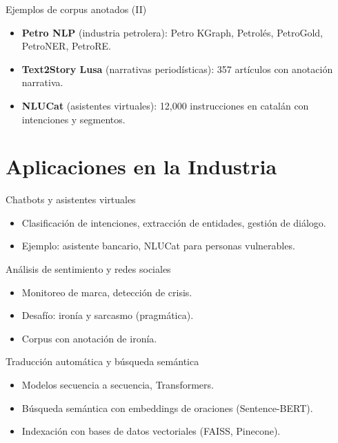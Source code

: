 \documentclass[aspectratio=169, 10pt, xcolor=table]{beamer}
\begin{document}
\begin{frame}{Ejemplos de corpus anotados (II)}
    \begin{itemize}
        \item \textbf{Petro NLP} (industria petrolera): Petro KGraph, Petrolés, PetroGold, PetroNER, PetroRE.
        \item \textbf{Text2Story Lusa} (narrativas periodísticas): 357 artículos con anotación narrativa.
        \item \textbf{NLUCat} (asistentes virtuales): 12,000 instrucciones en catalán con intenciones y segmentos.
    \end{itemize}
\end{frame}

\section{Aplicaciones en la Industria}

\begin{frame}{Chatbots y asistentes virtuales}
    \begin{itemize}
        \item Clasificación de intenciones, extracción de entidades, gestión de diálogo.
        \item Ejemplo: asistente bancario, NLUCat para personas vulnerables.
    \end{itemize}
\end{frame}

\begin{frame}{Análisis de sentimiento y redes sociales}
    \begin{itemize}
        \item Monitoreo de marca, detección de crisis.
        \item Desafío: ironía y sarcasmo (pragmática).
        \item Corpus con anotación de ironía.
    \end{itemize}
\end{frame}

\begin{frame}{Traducción automática y búsqueda semántica}
    \begin{itemize}
        \item Modelos secuencia a secuencia, Transformers.
        \item Búsqueda semántica con embeddings de oraciones (Sentence-BERT).
        \item Indexación con bases de datos vectoriales (FAISS, Pinecone).
    \end{itemize}
\end{frame}
\end{document}
